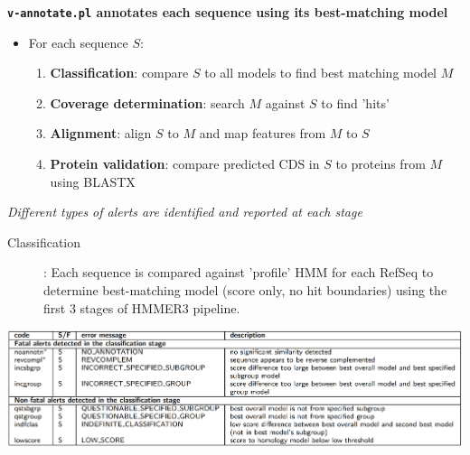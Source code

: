 \documentclass[landscape]{slides}
\begin{document}
\begin{slide}
\begin{center}
\textbf{\texttt{v-annotate.pl} annotates each sequence using its
  best-matching model}

\begin{itemize}
\item For each sequence $S$:
\small
\begin{enumerate}
\item \textbf{Classification}: compare $S$ to all models to find best matching model $M$
\item \textbf{Coverage determination}: search $M$ against $S$ to find 'hits'
\item \textbf{Alignment}: align $S$ to $M$ and map features from $M$ to $S$
\item \textbf{Protein validation}: compare predicted CDS in $S$ to proteins
  from $M$ using BLASTX
\end{enumerate}
\end{itemize}

\emph{Different types of alerts are identified and reported at each stage}

\end{center}

\vfill
\end{slide}
\begin{slide}
\begin{center}

\begin{description}
\item[Classification]: Each sequence is compared against 'profile'
  HMM for each RefSeq to determine best-matching model (score only, no
  hit boundaries) using the first 3 stages of HMMER3 pipeline. 
\end{description}


\includegraphics[width=10.5in]{figs/ss-class-alert-list}

\end{center}
\vfill
\end{slide}
\end{document}
